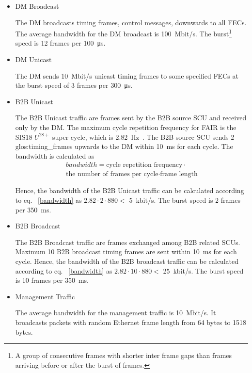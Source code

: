 \begin{itemize}
    \item DM Broadcast 

The DM broadcasts timing frames, control messages, downwards to all FECs. The average bandwidth for the DM broadcast is \SI{100}{Mbit/s}. The burst\footnote{A group of consecutive frames with shorter inter frame gaps than frames arriving before or after the burst of frames.} speed is 12 frames per \SI{100}{\micro\second}.
 		\item DM Unicast 

The DM sends \SI{10}{Mbit/s} unicast timing frames to some specified FECs at the burst speed of 3 frames per \SI{300}{\micro\second}.
	\item B2B Unicast

The B2B Unicast traffic are frames sent by the B2B source SCU and received only by the DM. The maximum cycle repetition frequency for FAIR is the SIS18 $U^{28+}$ super cycle, which is \SI{2.82}{\Hz}~\cite{liebermann_sis100_2013}. The B2B source SCU sends 2 \gls{glos:timing_frame}s upwards to the DM within \SI{10}{\ms} for each cycle. The bandwidth is calculated as
\begin{equation}
\begin{split}
		bandwidth=\text{cycle repetition frequency}\cdot   \\ \text{the number of frames per cycle} \cdot \text{frame length}
\label{bandwidth}
\end{split}
\end{equation}

Hence, the bandwidth of the B2B Unicast traffic can be calculated according to eq. ~\ref{bandwidth} as $2.82\cdot2\cdot880<$ \SI{5}{kbit/s}. The burst speed is 2 frames per \SI{350}{\ms}.
	\item B2B Broadcast

The B2B Broadcast traffic are frames exchanged among B2B related SCUs. Maximum 10 B2B broadcast timing frames are sent within \SI{10}{\ms} for each cycle. Hence, the bandwidth of the B2B broadcast traffic can be calculated according to eq. ~\ref{bandwidth} as $2.82\cdot10\cdot880<$ \SI{25}{kbit/s}. The burst speed is 10 frames per \SI{350}{\ms}.

	\item Management Traffic

The average bandwidth for the management traffic is \SI{10}{Mbit/s}. It broadcasts packets with random Ethernet frame length from 64 bytes to 1518 bytes. 
\end{itemize}

